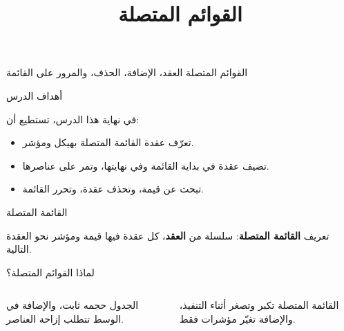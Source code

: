 \documentclass[aspectratio=169, 11pt, t, xcolor={table}]{beamer}
\title{القوائم المتصلة}
\begin{document}
{القوائم المتصلة}
{العقد، الإضافة، الحذف، والمرور على القائمة}

\begin{frame}{أهداف الدرس}
    \begin{tbox}{\faBullseye\quad في نهاية هذا الدرس، تستطيع أن:}
        \begin{itemize}
            \item تعرّف عقدة القائمة المتصلة بهيكل ومؤشر.
            \item تضيف عقدة في بداية القائمة وفي نهايتها، وتمر على عناصرها.
            \item تبحث عن قيمة، وتحذف عقدة، وتحرر القائمة.
        \end{itemize}
    \end{tbox}
\end{frame}

\begin{frame}{القائمة المتصلة}
    \begin{tbox}{\faLightbulb\quad تعريف}
        \textbf{القائمة المتصلة}: سلسلة من \textbf{العقد}، كل عقدة فيها قيمة ومؤشر نحو العقدة التالية.
    \end{tbox}
\end{frame}

\begin{frame}{لماذا القوائم المتصلة؟}
    \vspace{0.6cm}
    \begin{columns}[T]
        \begin{card}{الجدول}
            حجمه ثابت، والإضافة في الوسط تتطلب إزاحة العناصر.
        \end{card}
        \begin{card}{القائمة المتصلة}
            تكبر وتصغر أثناء التنفيذ، والإضافة تغيّر مؤشرات فقط.
        \end{card}
    \end{columns}
\end{frame}
\end{document}
